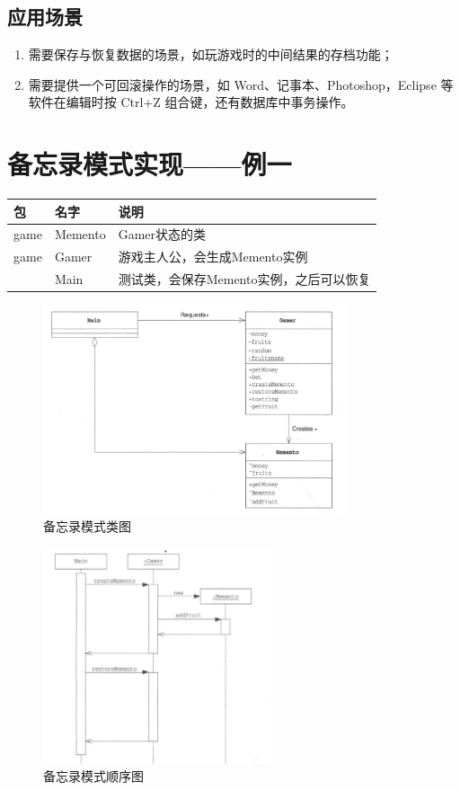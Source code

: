 \subsection{应用场景}
\begin{enumerate}
	\item 需要保存与恢复数据的场景，如玩游戏时的中间结果的存档功能；
	\item 需要提供一个可回滚操作的场景，如 Word、记事本、Photoshop，Eclipse 等软件在编辑时按 Ctrl+Z 组合键，还有数据库中事务操作。
\end{enumerate}
\section{备忘录模式实现——例一}
\begin{table}[!h]
	\begin{tabular}{|l|l|l|}
		\hline
		包&名字&说明\\
		\hline
		game&Memento&Gamer状态的类\\
		\hline
		game&Gamer&游戏主人公，会生成Memento实例\\
		\hline
		&Main&测试类，会保存Memento实例，之后可以恢复\\
		\hline
	\end{tabular}
\end{table}
\begin{figure}[!h]
	\centering
	\includegraphics[width=0.8\textwidth]{image/18-1}
	\caption{备忘录模式类图}
\end{figure}
\begin{figure}[!h]
	\centering
	\includegraphics[width=0.6\textwidth]{image/18-2}
	\caption{备忘录模式顺序图}
\end{figure}
